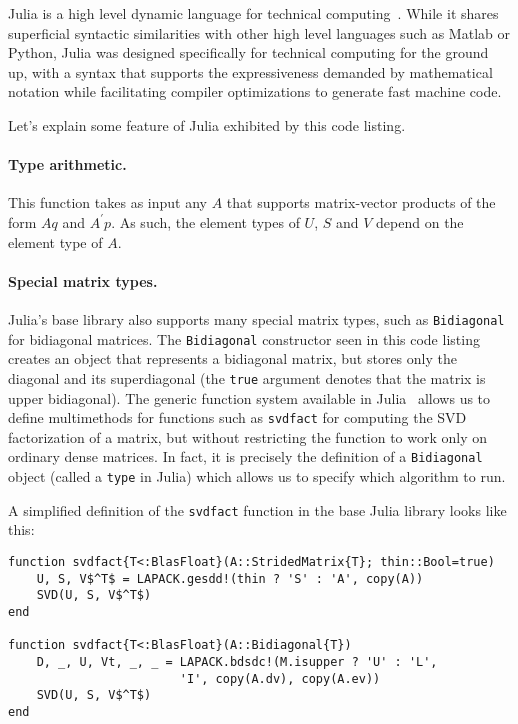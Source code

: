 \documentclass[final,leqno]{siamltex1213}
\begin{document}
Julia is a high level dynamic language for technical
computing~\cite{Bezanson2012,Bezanson2015}. While it shares superficial
syntactic similarities with other high level languages such as Matlab or
Python, Julia was designed specifically for technical computing for the ground
up, with a syntax that supports the expressiveness demanded by mathematical
notation while facilitating compiler optimizations to generate fast machine
code.

Let's explain some feature of Julia exhibited by this code listing.

\paragraph{Type arithmetic.}
This function takes as input any $A$ that supports
matrix-vector products of the form $Aq$ and $A^\prime p$. As such, the element
types of $U$, $S$ and $V$ depend on the element type of $A$.

\paragraph{Special matrix types.}
Julia's base library also supports many special matrix types, such as
\verb|Bidiagonal| for bidiagonal matrices. The \verb|Bidiagonal| constructor
seen in this code listing creates an object that represents a bidiagonal
matrix, but stores only the diagonal and its superdiagonal (the \verb|true|
argument denotes that the matrix is upper bidiagonal). The generic function
system available in Julia~\cite{Bezanson2012,Bezanson2015} allows us to define
multimethods for functions such as \verb|svdfact| for computing the SVD
factorization of a matrix, but without restricting the function to work only
on ordinary dense matrices. In fact, it is precisely the definition of a
\verb|Bidiagonal| object (called a \verb|type| in Julia) which allows us to
specify which algorithm to run.

A simplified definition of the \verb|svdfact| function in the base Julia
library looks like this:

\begin{lstlisting}
function svdfact{T<:BlasFloat}(A::StridedMatrix{T}; thin::Bool=true)
    U, S, V$^T$ = LAPACK.gesdd!(thin ? 'S' : 'A', copy(A))
    SVD(U, S, V$^T$)
end

function svdfact{T<:BlasFloat}(A::Bidiagonal{T})
    D, _, U, Vt, _, _ = LAPACK.bdsdc!(M.isupper ? 'U' : 'L',
                        'I', copy(A.dv), copy(A.ev))
    SVD(U, S, V$^T$)
end
\end{lstlisting}
\end{document}
